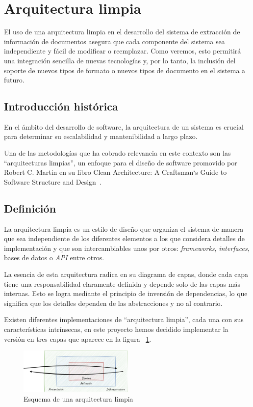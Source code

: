 \section{Arquitectura limpia}\label{sec:clean_architecture}

El uso de una arquitectura limpia en el desarrollo del sistema de extracción de información de documentos asegura que
cada componente del sistema sea independiente y fácil de modificar o reemplazar.
Como veremos, esto permitirá una integración sencilla de nuevas tecnologías y, por lo tanto, la inclusión del soporte
de nuevos tipos de formato o nuevos tipos de documento en el sistema a futuro.

\subsection{Introducción histórica}
En el ámbito del desarrollo de software, la arquitectura de un sistema es crucial para determinar su escalabilidad y
mantenibilidad a largo plazo.

Una de las metodologías que ha cobrado relevancia en este contexto son las ``arquitecturas limpias'', un enfoque para el
diseño de software promovido por Robert C. Martin en su libro Clean Architecture: A Craftsman`s Guide to Software
Structure and Design~\cite{book_martin_2017}.

\subsection{Definición}
La arquitectura limpia es un estilo de diseño que organiza el sistema de manera que sea independiente de los diferentes
elementos a los que considera detalles de implementación y que son intercambiables unos por otros:
\textit{frameworks}, \textit{interfaces}, bases de datos o \textit{API} entre otros.

La esencia de esta arquitectura radica en su diagrama de capas, donde cada capa tiene una responsabilidad claramente
definida y depende solo de las capas más internas.
Esto se logra mediante el principio de inversión de dependencias, lo que significa que los detalles dependen de las
abstracciones y no al contrario.

Existen diferentes implementaciones de ``arquitectura limpia'', cada una con sus características intrínsecas, en este
proyecto hemos decidido implementar la versión en tres capas que aparece en la figura
~\ref{fig:chapter_2.clean_architecture}.

\begin{figure}[ht]
    \begin{center}
        \includegraphics[width=0.5\textwidth]{./chapter/2/images/chapter_2.clean_architecture}
        \caption{Esquema de una arquitectura limpia}
        \label{fig:chapter_2.clean_architecture}
    \end{center}
\end{figure}


